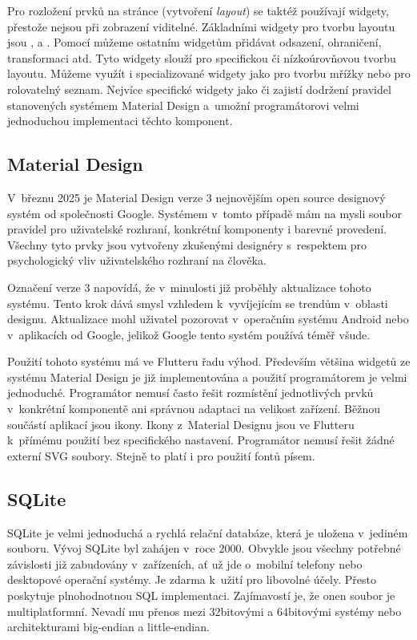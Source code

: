 \documentclass[
  biblatex,
  figures=true,
  tables=false,
  glossaries,
  index
]{kidiplom}
\begin{document}
Pro rozložení prvků na stránce (vytvoření \textit{layout}) se taktéž používají widgety, přestože nejsou při zobrazení viditelné. Základními widgety pro tvorbu layoutu jsou ,  a . Pomocí  můžeme ostatním widgetům přidávat odsazení, ohraničení, transformaci atd. Tyto widgety slouží pro specifickou či nízkoúrovňovou tvorbu layoutu. Můžeme využít i specializované widgety jako  pro tvorbu mřížky nebo  pro rolovatelný seznam. Nejvíce specifické widgety jako  či  zajistí dodržení pravidel stanovených systémem Material Design a~umožní programátorovi velmi jednoduchou implementaci těchto komponent.

\subsection{Material Design} \label{sec:material-design}
V~březnu 2025 je Material Design verze 3 \cite{m3} nejnovějším open source designový systém od společnosti Google. Systémem v~tomto případě mám na mysli soubor pravidel pro uživatelské rozhraní, konkrétní komponenty i barevné provedení. Všechny tyto prvky jsou vytvořeny zkušenými designéry s~respektem pro psychologický vliv uživatelského rozhraní na člověka.

Označení verze 3 napovídá, že v~minulosti již proběhly aktualizace tohoto systému. Tento krok dává smysl vzhledem k~vyvíjejícím se trendům v~oblasti designu. Aktualizace mohl uživatel pozorovat v~operačním systému Android nebo v~aplikacích od Google, jelikož Google tento systém používá téměř všude.

Použití tohoto systému má ve Flutteru řadu výhod. Především většina widgetů ze systému Material Design je již implementována a použití programátorem je velmi jednoduché. Programátor nemusí často řešit rozmístění jednotlivých prvků v~konkrétní komponentě ani správnou adaptaci na velikost zařízení. Běžnou součástí aplikací jsou ikony. Ikony z~Material Designu jsou ve Flutteru k~přímému použití bez specifického nastavení. Programátor nemusí řešit žádné externí SVG soubory. Stejně to platí i pro použití fontů písem.

\subsection{SQLite}
SQLite \cite{sqlite} je velmi jednoduchá a rychlá relační databáze, která je uložena v~jediném souboru. Vývoj SQLite byl zahájen v~roce 2000. Obvykle jsou všechny potřebné závislosti již zabudovány v~zařízeních, ať už jde o~mobilní telefony nebo desktopové operační systémy. Je zdarma k~užití pro libovolné účely. Přesto poskytuje plnohodnotnou SQL implementaci. Zajímavostí je, že onen soubor je multiplatformní. Nevadí mu přenos mezi 32bitovými a 64bitovými systémy nebo architekturami big-endian a little-endian.
\end{document}
